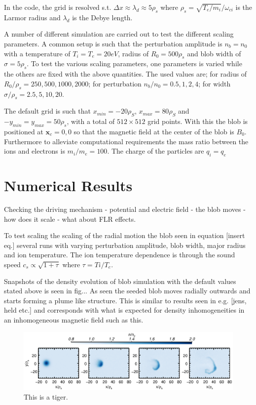 \documentclass[9pt,twocolumn]{article}
\newcommand{\fd}[1]{\mathbf{#1}}
\renewcommand{\=}[1]{\stackrel{#1}{=}} %
\theoremstyle{definition}
\theoremstyle{remark}
\begin{document}
In the code, the grid is resolved s.t. $\Delta x\approx \lambda_d\approx 5\rho_s$ where $\rho_s=\sqrt{T_e/m_i}/\omega_{ci}$ is the Larmor radius and $\lambda_d$ is the Debye length.

A number of different simulation are carried out to test the different scaling parameters. A common setup is such that the perturbation amplitude is $n_b=n_0$ with a temperature of $T_i=T_e=20 eV$, radius of $R_0=500\rho_s$ and blob width of $\sigma = 5 \rho_s$. To test the various scaling parameters, one parameters is varied while the others are fixed with the above quantities. The used values are; for radius of $R_0/\rho_s = {250,500,1000,2000}$; for perturbation $n_b/n_0 = {0.5,1,2,4}$; for width $\sigma/\rho_s = {2.5,5,10,20}$.

The default grid is such that $x_{min}=-20\rho_S$, $x_{max}=80\rho_S$ and $-y_{min}=y_{max}=50\rho_s$, with a total of $512\times 512$ grid points. With this the blob is positioned at $\fd x_c = {0,0}$ so that the magnetic field at the center of the blob is $B_0$. Furthermore to alleviate computational requirements the mass ratio between the ions and electrons is $m_i/m_e=100$. The charge of the particles are $q_i=q_e$
\section{Numerical Results}
Checking the driving mechanism - potential and electric field - the blob moves - how does it scale - what about FLR effects.

To test scaling the scaling of the radial motion the blob seen in equation [insert eq.] several runs with varying perturbation amplitude, blob width, major radius and ion temperature. The ion temperature dependence is through the sound speed $c_s\propto \sqrt{1+\tau}$ where $\tau = Ti/T_e$.

Snapshots of the density evolution of blob simulation with the default values stated above is seen in fig... As seen the seeded blob moves radially outwards and starts forming a plume like structure. This is similar to results seen in e.g. [jens, held etc.] and corresponds with what is expected for density inhomogeneities in an inhomogeneous magnetic field such as this. 

\begin{figure}[h]
  \includegraphics[trim=0mm 128mm 0mm 0mm,width=\textwidth]{Pictures/fourcontour.eps}
  \caption{This is a tiger.}
\end{figure}
\end{document}
